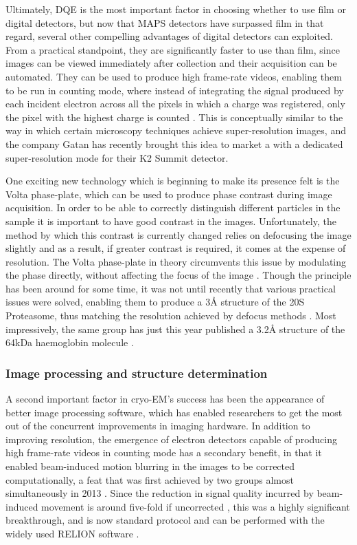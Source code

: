 \documentclass[a4paper,11pt,twoside,openright]{scrbook}
\begin{document}
Ultimately, DQE is the most important factor in choosing whether to use film or digital detectors, but now that MAPS detectors have surpassed film in that regard, several other compelling advantages of digital detectors can exploited. From a practical standpoint, they are significantly faster to use than film, since images can be viewed immediately after collection and their acquisition can be automated. They can be used to produce high frame-rate videos, enabling them to be run in counting mode, where instead of integrating the signal produced by each incident electron across all the pixels in which a charge was registered, only the pixel with the highest charge is counted \cite{McMullan2009a}. This is conceptually similar to the way in which certain microscopy techniques achieve super-resolution images, and the company Gatan has recently brought this idea to market a with a dedicated super-resolution mode for their K2 Summit detector.

One exciting new technology which is beginning to make its presence felt is the Volta phase-plate, which can be used to produce phase contrast during image acquisition. In order to be able to correctly distinguish different particles in the sample it is important to have good contrast in the images. Unfortunately, the method by which this contrast is currently changed relies on defocusing the image slightly and as a result, if greater contrast is required, it comes at the expense of resolution. The Volta phase-plate in theory circumvents this issue by modulating the phase directly, without affecting the focus of the image \cite{Danev2014}. Though the principle has been around for some time, it was not until recently that various practical issues were solved, enabling them to produce a 3Å structure of the 20S Proteasome, thus matching the resolution achieved by defocus methods \cite{Danev2016}. Most impressively, the same group has just this year published a 3.2Å structure of the 64kDa haemoglobin molecule \cite{Khoshouei2017}.

\subsubsection{Image processing and structure determination}
A second important factor in cryo-EM's success has been the appearance of better image processing software, which has enabled researchers to get the most out of the concurrent improvements in imaging hardware. In addition to improving resolution, the emergence of electron detectors capable of producing high frame-rate videos in counting mode has a secondary benefit, in that it enabled beam-induced motion blurring in the images to be corrected computationally, a feat that was first achieved by two groups almost simultaneously in 2013 \cite{Bai2013, Li2013}. Since the reduction in signal quality incurred by beam-induced movement is around five-fold if uncorrected \cite{Henderson1985}, this was a highly significant breakthrough, and is now standard protocol and can be performed with the widely used RELION software \cite{Scheres2012,Scheres2014}.
\end{document}
